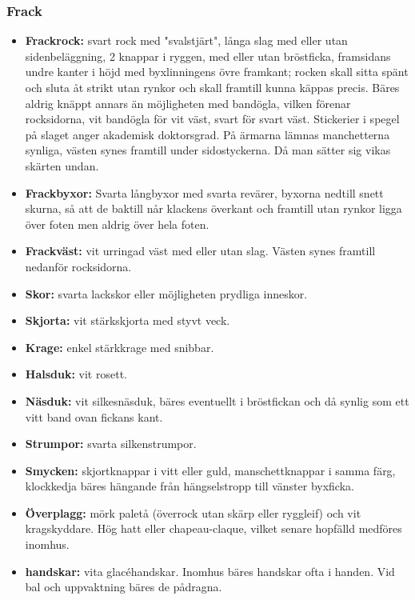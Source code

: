 \subsubsection*{\textbf{Frack}}
\begin{itemize}

    \item[]\textbf{Frackrock:} svart rock med "svalstjärt", långa slag med eller utan sidenbeläggning, 2 knappar i ryggen, med eller utan bröstficka, framsidans undre kanter i höjd med byxlinningens övre framkant; rocken skall sitta spänt och sluta åt strikt utan rynkor och skall framtill kunna käppas precis. Bäres aldrig knäppt annars än möjligheten med bandögla, vilken förenar rocksidorna, vit bandögla för vit väst, svart för svart väst. Stickerier i spegel på slaget anger akademisk doktorsgrad. På ärmarna lämnas manchetterna synliga, västen synes framtill under sidostyckerna. Då man sätter sig vikas skärten undan.

    \item[]\textbf{Frackbyxor:} Svarta långbyxor med svarta revärer, byxorna nedtill snett skurna, så att de baktill når klackens överkant och framtill utan rynkor ligga över foten men aldrig över hela foten.

    \item[]\textbf{Frackväst:} vit urringad väst med eller utan slag. Västen synes framtill nedanför rocksidorna.

    \item[]\textbf{Skor:} svarta lackskor eller möjligheten prydliga inneskor.

    \item[]\textbf{Skjorta:} vit stärkskjorta med styvt veck.

    \item[]\textbf{Krage:} enkel stärkkrage med snibbar.

    \item[]\textbf{Halsduk:} vit rosett.

    \item[]\textbf{Näsduk:} vit silkesnäsduk, bäres eventuellt i bröstfickan och då synlig som ett vitt band ovan fickans kant.

    \item[]\textbf{Strumpor:} svarta silkenstrumpor.

    \item[]\textbf{Smycken:} skjortknappar i vitt eller guld, manschettknappar i samma färg, klockkedja bäres hängande från hängselstropp till vänster byxficka.

    \item[]\textbf{Överplagg:} mörk paletå (överrock utan skärp eller ryggleif) och vit kragskyddare. Hög hatt eller chapeau-claque, vilket senare hopfälld medföres inomhus.

    \item[]\textbf{handskar:} vita glacéhandskar. Inomhus bäres handskar ofta i handen. Vid bal och uppvaktning bäres de pådragna.

\end{itemize}

